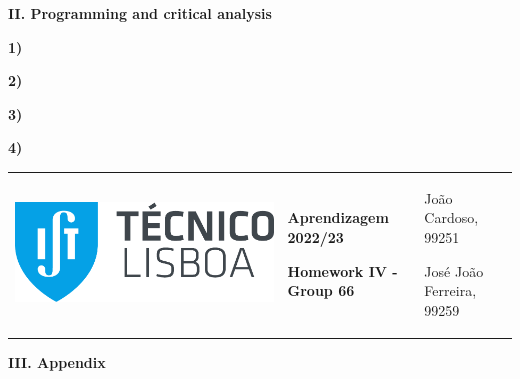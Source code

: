 \documentclass[11pt,a4paper]{article}
\begin{document}
\begin{center}
  \textbf{II. Programming and critical analysis}
\end{center}

\begin{flushleft}
  \textbf{1)}
\end{flushleft}

\begin{flushleft}
  \textbf{2)}
\end{flushleft}

\begin{flushleft}
  \textbf{3)}
\end{flushleft}

\begin{flushleft}
  \textbf{4)}
\end{flushleft}

\pagebreak
\hspace{-8.25mm}
\color{darkgray}
\renewcommand\tabularxcolumn[1]{m{#1}}
\begin{tabularx}{1.09\textwidth} {>{\raggedright\arraybackslash}X >{\centering\arraybackslash}X >{\raggedleft\arraybackslash}X}
  \includegraphics[scale=0.2]{tecnico.pdf}                           &
  \textbf{Aprendizagem 2022/23} \par \textbf{Homework IV - Group 66} &
  João Cardoso, 99251 \par José João Ferreira, 99259
\end{tabularx}
\renewcommand\tabularxcolumn[1]{p{#1}}
\color{black}

\begin{center}
  \textbf{III. Appendix}
\end{center}

\end{document}
